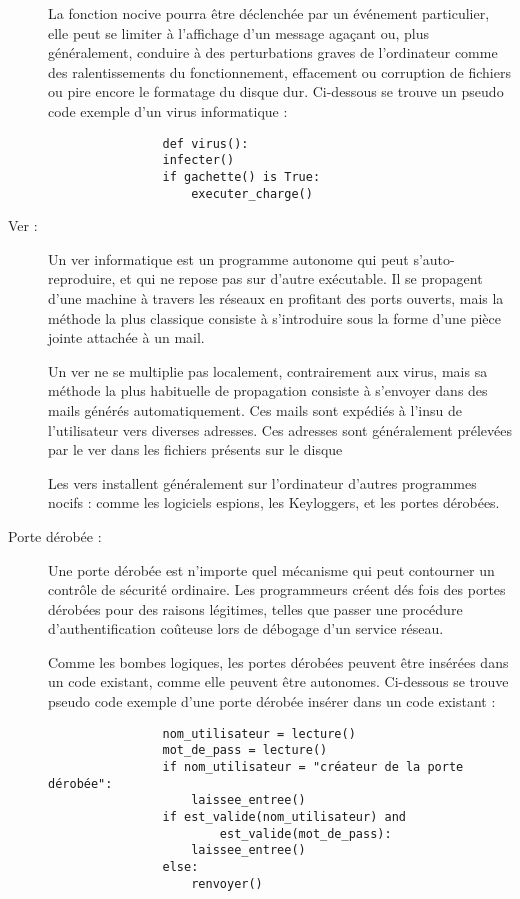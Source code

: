 \begin{description}
            La fonction nocive pourra être déclenchée par un événement particulier, elle peut se limiter 
            à l'affichage d'un message agaçant ou, plus généralement, conduire à des perturbations graves 
            de l'ordinateur comme des ralentissements du fonctionnement, effacement ou corruption de 
            fichiers ou pire encore le formatage du disque dur. \cite{virus_informatique} %
            Ci-dessous se trouve un pseudo code exemple d'un virus informatique :
            \begin{verbatim}
                def virus():
                infecter()
                if gachette() is True:
                    executer_charge()
            \end{verbatim}

        \item[Ver :] Un ver informatique est un programme autonome qui peut s'auto-reproduire, 
            et qui ne repose pas sur d’autre exécutable. Il se propagent d'une machine à travers les 
            réseaux en profitant des ports ouverts, mais la méthode la plus classique consiste à s'introduire 
            sous la forme d'une pièce jointe attachée à un mail.

            Un ver ne se multiplie pas localement, contrairement aux virus, mais sa méthode la plus 
            habituelle de propagation consiste à s'envoyer dans des mails générés automatiquement. 
            Ces mails sont expédiés à l'insu de l'utilisateur vers diverses adresses. 
            Ces adresses sont généralement prélevées par le ver dans les fichiers présents sur le disque

            Les vers installent généralement sur l'ordinateur d'autres programmes nocifs : comme les logiciels 
            espions, les Keyloggers, et les portes dérobées. \cite{ver_informatique}

        \item[Porte dérobée :] Une porte dérobée est n'importe quel mécanisme qui peut contourner un
            contrôle de sécurité ordinaire. Les programmeurs créent dés fois des portes dérobées pour 
            des raisons légitimes, telles que passer une procédure d'authentification coûteuse lors 
            de débogage d'un service réseau.

            Comme les bombes logiques, les portes dérobées peuvent être insérées dans un code existant, comme elle
            peuvent être autonomes. Ci-dessous se trouve pseudo code exemple d'une porte dérobée insérer dans 
            un code existant :
            \begin{verbatim}
                nom_utilisateur = lecture()
                mot_de_pass = lecture()
                if nom_utilisateur = "créateur de la porte dérobée":
                    laissee_entree()
                if est_valide(nom_utilisateur) and 
                        est_valide(mot_de_pass):
                    laissee_entree()
                else:
                    renvoyer()
            \end{verbatim}


\end{description}
